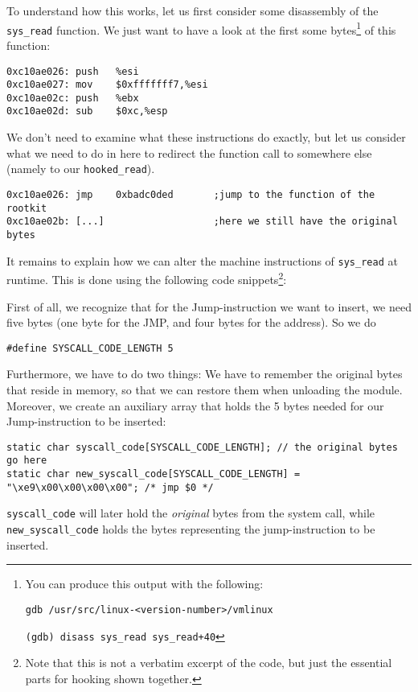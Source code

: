 \documentclass[10pt, letterpaper]{scrartcl}
\begin{document}
To understand how this works, let us first consider some disassembly of the \texttt{sys\_read} function. We just want to have a look at the first some bytes\footnote{You can produce this output with the following:

\texttt{gdb /usr/src/linux-<version-number>/vmlinux}

\texttt{(gdb) disass sys\_read\ sys\_read+40}} of this function:

\begin{verbatim}
0xc10ae026:	push   %esi
0xc10ae027:	mov    $0xfffffff7,%esi
0xc10ae02c:	push   %ebx
0xc10ae02d:	sub    $0xc,%esp
\end{verbatim}

We don't need to examine what these instructions do exactly, but let us consider what we need to do in here to redirect the function call to somewhere else (namely to our \texttt{hooked\_read}).

\begin{verbatim}
0xc10ae026:	jmp    0xbadc0ded       ;jump to the function of the rootkit
0xc10ae02b:	[...]                   ;here we still have the original bytes
\end{verbatim}

It remains to explain how we can alter the machine instructions of \texttt{sys\_read} at runtime. This is done using the following code snippets\footnote{Note that this is not a verbatim excerpt of the code, but just the essential parts for hooking shown together.}:

First of all, we recognize that for the Jump-instruction we want to insert, we need five bytes (one byte for the JMP, and four bytes for the address). So we do

\begin{verbatim}
#define SYSCALL_CODE_LENGTH 5
\end{verbatim}

Furthermore, we have to do two things: We have to remember the original bytes that reside in memory, so that we can restore them when unloading the module. Moreover, we create an auxiliary array that holds the 5 bytes needed for our Jump-instruction to be inserted:

\begin{verbatim}
static char syscall_code[SYSCALL_CODE_LENGTH]; // the original bytes go here
static char new_syscall_code[SYSCALL_CODE_LENGTH] = "\xe9\x00\x00\x00\x00"; /* jmp $0 */
\end{verbatim}


\texttt{syscall\_code} will later hold the \emph{original} bytes from the system call, while \texttt{new\_syscall\_code} holds the bytes representing the jump-instruction to be inserted. 
\end{document}
